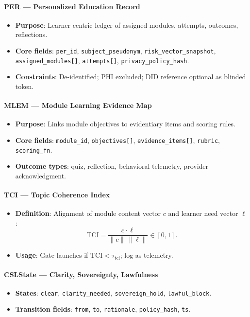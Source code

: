 \documentclass[11pt]{article}
\theoremstyle{plain}
\begin{document}
\paragraph{PER — Personalized Education Record}
\begin{itemize}
  \item \textbf{Purpose}: Learner-centric ledger of assigned modules, attempts, outcomes, reflections.
  \item \textbf{Core fields}: \texttt{per\_id}, \texttt{subject\_pseudonym}, \texttt{risk\_vector\_snapshot}, \texttt{assigned\_modules[]}, \texttt{attempts[]}, \texttt{privacy\_policy\_hash}.
  \item \textbf{Constraints}: De-identified; PHI excluded; DID reference optional as blinded token.
\end{itemize}

\paragraph{MLEM — Module Learning Evidence Map}
\begin{itemize}
  \item \textbf{Purpose}: Links module objectives to evidentiary items and scoring rules.
  \item \textbf{Core fields}: \texttt{module\_id}, \texttt{objectives[]}, \texttt{evidence\_items[]}, \texttt{rubric}, \texttt{scoring\_fn}.
  \item \textbf{Outcome types}: quiz, reflection, behavioral telemetry, provider acknowledgment.
\end{itemize}

\paragraph{TCI — Topic Coherence Index}
\begin{itemize}
  \item \textbf{Definition}: Alignment of module content vector $c$ and learner need vector $\ell$:
  \[
  \mathrm{TCI}=\frac{c\cdot \ell}{\|c\|\,\|\ell\|}\in[0,1].
  \]
  \item \textbf{Usage}: Gate launches if $\mathrm{TCI}<\tau_{\mathrm{tci}}$; log as telemetry.
\end{itemize}

\paragraph{CSLState — Clarity, Sovereignty, Lawfulness}
\begin{itemize}
  \item \textbf{States}: \texttt{clear}, \texttt{clarity\_needed}, \texttt{sovereign\_hold}, \texttt{lawful\_block}.
  \item \textbf{Transition fields}: \texttt{from}, \texttt{to}, \texttt{rationale}, \texttt{policy\_hash}, \texttt{ts}.
\end{itemize}
\end{document}
